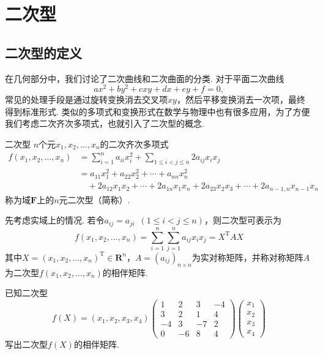 \chapter{二次型}

\section{二次型的定义}

在几何部分中，我们讨论了二次曲线和二次曲面的分类. 对于平面二次曲线
\[ax^2 + by^2 + cxy + dx + ey + f = 0,\]
常见的处理手段是通过旋转变换消去交叉项$xy$，然后平移变换消去一次项，最终得到标准形式. 类似的多项式和变换形式在数学与物理中也有很多应用，为了方便我们考虑二次齐次多项式，也就引入了二次型的概念.

\begin{definition}{二次型}{} 
    $n$个元$x_1,x_2,\ldots,x_n$的二次齐次多项式
    \begin{align*}
        f(x_1,x_2,\ldots,x_n) & = \sum_{i=1}^{n}a_{ii}x_i^2+\sum\limits_{1\leqslant i<j\leqslant n}2a_{ij}x_ix_j    \\
                              & = a_{11}x_1^2+a_{22}x_2^2+\cdots+a_{nn}x_n^2                                        \\
                              & \quad +2a_{12}x_1x_2+\cdots+2a_{1n}x_1x_n+2a_{23}x_2x_3+\cdots+2a_{n-1,n}x_{n-1}x_n
    \end{align*}
    称为域$\mathbf{F}$上的$n$元二次型（简称）.
\end{definition}
先考虑实域上的情况. 若令$a_{ij}=a_{ji}\enspace(1\leqslant i<j\leqslant n)$，则二次型可表示为
\[f(x_1,x_2,\ldots,x_n)=\sum_{i=1}^{n}\sum_{j=1}^{n}a_{ij}x_ix_j=X^\mathrm{T}AX\]
其中$X=(x_1,x_2,\ldots,x_n)^\mathrm{T}\in\mathbf{R}^n$，$A=(a_{ij})_{n\times n}$为实对称矩阵，并称对称矩阵$A$为二次型$f(x_1,x_2,\ldots,x_n)$的相伴矩阵.

\begin{example}{}{}
    已知二次型
    \[f(X)=(x_1,x_2,x_3,x_4)\begin{pmatrix}
            1 & 2 & 3 & -4 \\ 3 & 2 & 1 & 4 \\ -4 & 3 & -7 & 2 \\ 0 & -6 & 8 & 4
        \end{pmatrix}\begin{pmatrix}
            x_1 \\ x_2 \\ x_3 \\ x_4
        \end{pmatrix}\]
    写出二次型$f(X)$的相伴矩阵.
\end{example}

